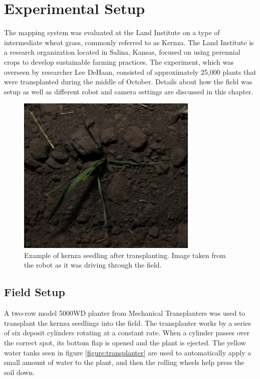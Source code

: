 
\cleardoublepage

\chapter{Experimental Setup}
\label{chapter:experiment}

The mapping system was evaluated at the Land Institute on a type of intermediate wheat grass, commonly referred to as Kernza.  The Land Institute is a research organization located in Salina, Kansas, focused on using perennial crops to develop sustainable farming practices.  The experiment, which was overseen by researcher Lee DeHaan, consisted of approximately 25,000 plants that were transplanted during the middle of October.  Details about how the field was setup as well as different robot and camera settings are discussed in this chapter. 

\begin{figure}
	\centering
    \includegraphics[height=3in]{figures/kernza_example.jpg}
    \caption[Kernza seedling]{Example of kernza seedling after transplanting. Image taken from the robot as it was driving through the field.}
    \label{figure:kernza_example}
\end{figure}

\section{Field Setup}
\label{section:field_setup}

A two-row model 5000WD planter from Mechanical Transplanters was used to transplant the kernza seedlings into the field.  The transplanter works by a series of six deposit cylinders rotating at a constant rate.  When a cylinder passes over the correct spot, its bottom flap is opened and the plant is ejected.  The yellow water tanks seen in figure \ref{figure:transplanter} are used to automatically apply a small amount of water to the plant, and then the rolling wheels help press the soil down.  

